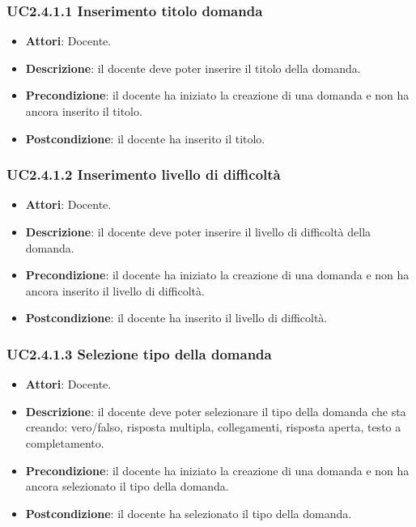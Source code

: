 \subsubsection{UC2.4.1.1 Inserimento titolo domanda}
\begin{itemize}
\item \textbf{Attori}: Docente.
\item \textbf{Descrizione}: il docente deve poter inserire il titolo della domanda.
\item \textbf{Precondizione}: il docente ha iniziato la creazione di una domanda e non ha ancora inserito il titolo.
\item \textbf{Postcondizione}: il docente ha inserito il titolo.
\end{itemize}
\subsubsection{UC2.4.1.2 Inserimento livello di difficoltà }
\begin{itemize}
\item \textbf{Attori}: Docente.
\item \textbf{Descrizione}: il docente deve poter inserire il livello di difficoltà della domanda.
\item \textbf{Precondizione}: il docente ha iniziato la creazione di una domanda e non ha ancora inserito il livello di difficoltà.
\item \textbf{Postcondizione}: il docente ha inserito il livello di difficoltà.
\end{itemize}
\subsubsection{UC2.4.1.3 Selezione tipo della domanda}
\begin{itemize}
\item \textbf{Attori}: Docente.
\item \textbf{Descrizione}: il docente deve poter selezionare il tipo della domanda che sta creando: vero/falso, risposta multipla, collegamenti, risposta aperta, testo a completamento.
\item \textbf{Precondizione}: il docente ha iniziato la creazione di una domanda e non ha ancora selezionato il tipo della domanda.
\item \textbf{Postcondizione}: il docente ha selezionato il tipo della domanda.
\end{itemize}
